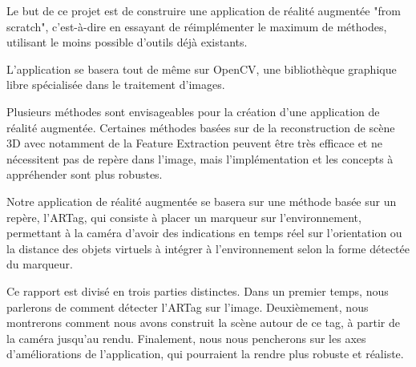 
Le but de ce projet est de construire une application de réalité augmentée "from scratch", c'est-à-dire en essayant de réimplémenter le maximum de méthodes, utilisant le moins possible d'outils déjà existants.

L'application se basera tout de même sur OpenCV, une bibliothèque graphique libre spécialisée dans le traitement d'images.

Plusieurs méthodes sont envisageables pour la création d'une application de réalité augmentée. Certaines méthodes basées sur de la reconstruction de scène 3D avec notamment de la Feature Extraction peuvent être très efficace et ne nécessitent pas de repère dans l'image, mais l'implémentation et les concepts à appréhender sont plus robustes.

Notre application de réalité augmentée se basera sur une méthode basée sur un repère, l'ARTag, qui consiste à placer un marqueur sur l'environnement, permettant à la caméra d'avoir des indications en temps réel sur l'orientation ou la distance des objets virtuels à intégrer à l'environnement selon la forme détectée du marqueur. 

Ce rapport est divisé en trois parties distinctes. Dans un premier temps, nous parlerons de comment détecter l'ARTag sur l'image. Deuxièmement, nous montrerons comment nous avons construit la scène autour de ce tag, à partir de la caméra jusqu'au rendu. Finalement, nous nous pencherons sur les axes d'améliorations de l'application, qui pourraient la rendre plus robuste et réaliste.
